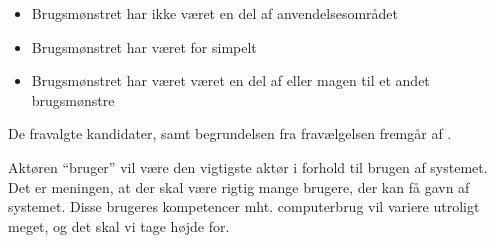 \begin{itemize}[noitemsep]
\item Brugsmønstret har ikke været en del af anvendelsesområdet
\item Brugsmønstret har været for simpelt
\item Brugsmønstret har været været en del af eller magen til et andet brugsmønstre
\end{itemize}

De fravalgte kandidater, samt begrundelsen fra fravælgelsen fremgår af .

Aktøren ``bruger'' vil være den vigtigste aktør i forhold til brugen af systemet. Det er meningen, at der skal være rigtig mange brugere, der kan få gavn af systemet. Disse brugeres kompetencer mht. computerbrug vil variere utroligt meget, og det skal vi tage højde for.



